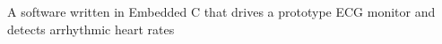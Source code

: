 A software written in Embedded C that drives a prototype ECG monitor and detects arrhythmic heart rates 